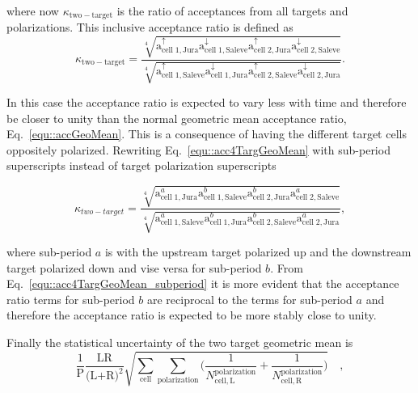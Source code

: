 \noindent
where now $\kappa_{\mathrm{two-target}}$ is the ratio of acceptances from all
targets and polarizations.  This inclusive acceptance ratio is defined as
\begin{equation}
  \label{equ::acc4TargGeoMean}
  \kappa_{\mathrm{two-target}} =
  \frac{
    \sqrt[4]{
      \mathrm{a}^{\uparrow}_{\mathrm{cell\;1,Jura}}
      \mathrm{a}^{\downarrow}_{\mathrm{cell\;1,Saleve}}
      \mathrm{a}^{\uparrow}_{\mathrm{cell\;2,Jura}}
      \mathrm{a}^{\downarrow}_{\mathrm{cell\;2,Saleve}}}
  }{
    \sqrt[4]{
      \mathrm{a}^{\uparrow}_{\mathrm{cell\;1,Saleve}}
      \mathrm{a}^{\downarrow}_{\mathrm{cell\;1,Jura}}
      \mathrm{a}^{\uparrow}_{\mathrm{cell\;2,Saleve}}
      \mathrm{a}^{\downarrow}_{\mathrm{cell\;2,Jura}}}
  }.
\end{equation}

\noindent
In this case the acceptance ratio is expected to vary less with time and
therefore be closer to unity than the normal geometric mean acceptance ratio,
Eq.~\ref{equ::accGeoMean}.  This is a consequence of having the different target
cells oppositely polarized.  Rewriting Eq.~\ref{equ::acc4TargGeoMean} with
sub-period superscripts instead of target polarization superscripts

\begin{equation}
  \label{equ::acc4TargGeoMean_subperiod}
  \kappa_{two-target} = \frac{
    \sqrt[4]{
      \mathrm{a}^{a}_{\mathrm{cell\;1,Jura}}
      \mathrm{a}^{b}_{\mathrm{cell\;1,Saleve}}
      \mathrm{a}^{b}_{\mathrm{cell\;2,Jura}}
      \mathrm{a}^{a}_{\mathrm{cell\;2,Saleve}}}
  }{
    \sqrt[4]{
      \mathrm{a}^{a}_{\mathrm{cell\;1,Saleve}}
      \mathrm{a}^{b}_{\mathrm{cell\;1,Jura}}
      \mathrm{a}^{b}_{\mathrm{cell\;2,Saleve}}
      \mathrm{a}^{a}_{\mathrm{cell\;2,Jura}}}
  },
\end{equation}

\noindent
where sub-period $a$ is with the upstream target polarized up and the downstream
target polarized down and vise versa for sub-period $b$.  From
Eq.~\ref{equ::acc4TargGeoMean_subperiod} it is more evident that the acceptance
ratio terms for sub-period $b$ are reciprocal to the terms for sub-period $a$
and therefore the acceptance ratio is expected to be more stably close to unity.

Finally the statistical uncertainty of the two target geometric mean is
\begin{equation}
  \frac{1}{\mathrm{P}}
  \frac{\text{LR}}{\Big( \text{L+R} \Big)^2}
  \sqrt{
    \sum_{\mathrm{cell}}\sum_{\mathrm{polarization}}
    \Big(
    \frac{1}{N_{\mathrm{cell,L}}^{\mathrm{polarization}}}
    +
    \frac{1}{N_{\mathrm{cell,R}}^{\mathrm{polarization}}}
    \Big)
  } \quad,
\end{equation}

